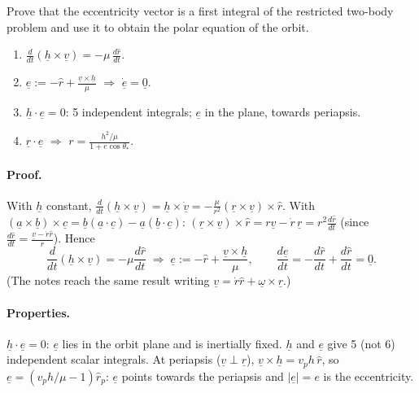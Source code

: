 \begin{qbox}
Prove that the eccentricity vector is a first integral of the restricted two-body problem and use it to obtain the polar equation of the orbit.
\end{qbox}
\begin{outline}
\begin{enumerate}
\item $\frac{d}{dt}(\underline h\times\underline v)=-\mu\,\frac{d\hat r}{dt}$.
\item $\underline e:=-\hat r+\frac{\underline v\times\underline h}{\mu}$ $\Rightarrow$ $\dot{\underline e}=\underline 0$.
\item $\underline h\cdot\underline e=0$: 5 independent integrals; $\underline e$ in the plane, towards periapsis.
\item $\underline r\cdot\underline e$ $\Rightarrow$ $r=\frac{h^2/\mu}{1+e\cos\theta_*}$.
\end{enumerate}
\end{outline}
\answer
\paragraph{Proof.} With $\underline h$ constant,
$\frac{d}{dt}(\underline h\times\underline v)=\underline h\times\dot{\underline v}=-\frac{\mu}{r^2}(\underline r\times\underline v)\times\hat r$.
With $(\underline a\times\underline b)\times\underline c=\underline b(\underline a\cdot\underline c)-\underline a(\underline b\cdot\underline c)$:
$(\underline r\times\underline v)\times\hat r=r\underline v-\dot r\,\underline r=r^2\frac{d\hat r}{dt}$ (since $\frac{d\hat r}{dt}=\frac{\underline v-\dot r\hat r}{r}$). Hence
\begin{equation}
\frac{d}{dt}\left(\underline h\times\underline v\right)=-\mu\frac{d\hat r}{dt}
\;\Longrightarrow\;
\underline{e}:=-\hat{r}+\frac{\underline{v}\times\underline{h}}{\mu},\qquad \frac{d\underline e}{dt}=-\frac{d\hat r}{dt}+\frac{d\hat r}{dt}=\underline 0 .
\end{equation}
(The notes reach the same result writing $\underline v=\dot r\hat r+\underline\omega\times\underline r$.)

\paragraph{Properties.} $\underline h\cdot\underline e=0$: $\underline e$ lies in the orbit plane and is inertially fixed. $\underline h$ and $\underline e$ give 5 (not 6)
independent scalar integrals. At periapsis ($\underline v\perp\underline r$), $\underline v\times\underline h=v_ph\,\hat r$, so $\underline e=(v_ph/\mu-1)\hat r_p$: $\underline e$
points towards the periapsis and $|\underline e|=e$ is the eccentricity.

